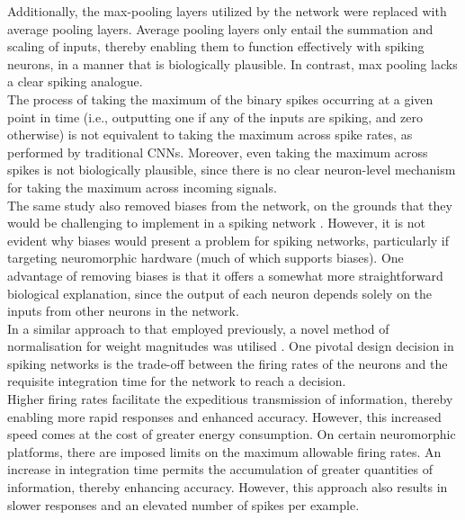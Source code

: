 \noindent Additionally, the max-pooling layers utilized by the network were replaced with average pooling layers. Average pooling layers only entail the summation and scaling of inputs, thereby enabling them to function effectively with spiking neurons, in a manner that is biologically plausible. In contrast, max pooling lacks a clear spiking analogue. \\

\noindent The process of taking the maximum of the binary spikes occurring at a given point in time (i.e., outputting one if any of the inputs are spiking, and zero otherwise) is not equivalent to taking the maximum across spike rates, as performed by traditional CNNs. Moreover, even taking the maximum across spikes is not biologically plausible, since there is no clear neuron-level mechanism for taking the maximum across incoming signals. \\

\noindent The same study also removed biases from the network, on the grounds that they would be challenging to implement in a spiking network \cite{cao2015spiking}. However, it is not evident why biases would present a problem for spiking networks, particularly if targeting neuromorphic hardware (much of which supports biases). One advantage of removing biases is that it offers a somewhat more straightforward biological explanation, since the output of each neuron depends solely on the inputs from other neurons in the network. \\ 

\noindent In a similar approach to that employed previously, a novel method of normalisation for weight magnitudes was utilised \cite{diehl2015fast}. One pivotal design decision in spiking networks is the trade-off between the firing rates of the neurons and the requisite integration time for the network to reach a decision. \\

\noindent Higher firing rates facilitate the expeditious transmission of information, thereby enabling more rapid responses and enhanced accuracy. However, this increased speed comes at the cost of greater energy consumption. On certain neuromorphic platforms, there are imposed limits on the maximum allowable firing rates. An increase in integration time permits the accumulation of greater quantities of information, thereby enhancing accuracy. However, this approach also results in slower responses and an elevated number of spikes per example.\\

